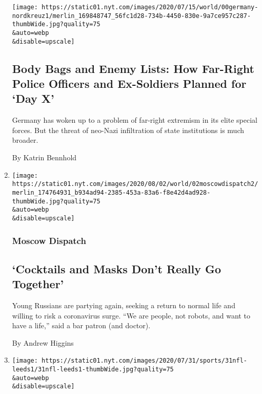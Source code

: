 \begin{enumerate}
  \texttt{[image: https://static01.nyt.com/images/2020/07/15/world/00germany-nordkreuz1/merlin\_169848747\_56fc1d28-734b-4450-830e-9a7ce957c287-thumbWide.jpg?quality=75\\\&auto=webp\\\&disable=upscale]}

  \hypertarget{body-bags-and-enemy-lists-how-far-right-police-officers-and-ex-soldiers-planned-for-day-x}{%
  \subsection{Body Bags and Enemy Lists: How Far-Right Police Officers
  and Ex-Soldiers Planned for `Day
  X'}\label{body-bags-and-enemy-lists-how-far-right-police-officers-and-ex-soldiers-planned-for-day-x}}

  Germany has woken up to a problem of far-right extremism in its elite
  special forces. But the threat of neo-Nazi infiltration of state
  institutions is much broader.

  By Katrin Bennhold
\item
  \href{/2020/08/01/world/europe/russia-moscow-coronavirus.html}{}

  \texttt{[image: https://static01.nyt.com/images/2020/08/02/world/02moscowdispatch2/merlin\_174764931\_b934ad94-2385-453a-83a6-f8e42d4ad928-thumbWide.jpg?quality=75\\\&auto=webp\\\&disable=upscale]}

  \hypertarget{moscow-dispatch}{%
  \subsubsection{Moscow Dispatch}\label{moscow-dispatch}}

  \hypertarget{cocktails-and-masks-dont-really-go-together}{%
  \subsection{`Cocktails and Masks Don't Really Go
  Together'}\label{cocktails-and-masks-dont-really-go-together}}

  Young Russians are partying again, seeking a return to normal life and
  willing to risk a coronavirus surge. ``We are people, not robots, and
  want to have a life,'' said a bar patron (and doctor).

  By Andrew Higgins
\item
  \href{/2020/07/31/sports/soccer/leeds-united-san-francisco-49ers.html}{}

  \texttt{[image: https://static01.nyt.com/images/2020/07/31/sports/31nfl-leeds1/31nfl-leeds1-thumbWide.jpg?quality=75\\\&auto=webp\\\&disable=upscale]}


\end{enumerate}
